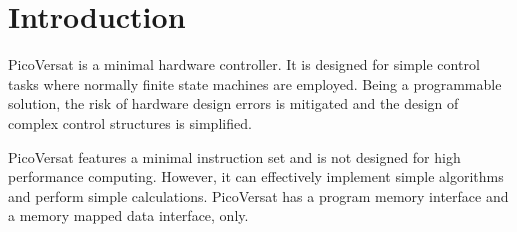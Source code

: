 \section{Introduction}

PicoVersat is a minimal hardware controller. It is designed for simple control
tasks where normally finite state machines are employed. Being a programmable
solution, the risk of hardware design errors is mitigated and the design of
complex control structures is simplified.

PicoVersat features a minimal instruction set and is not designed for high
performance computing. However, it can effectively implement simple algorithms
and perform simple calculations. PicoVersat has a program memory interface and a
memory mapped data interface, only.

